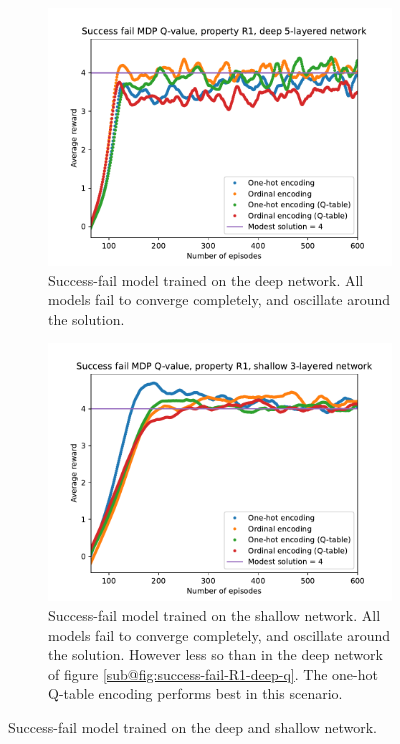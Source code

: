 \begin{figure}
    \centering
    \begin{subfigure}[b]{0.9\textwidth}
        \centering
        \includegraphics[width=\textwidth]{plot/success-fail-R1-q.pdf}
        \caption{Success-fail model trained on the deep network. All models fail to converge completely, and oscillate around the solution.}
        \label{fig:success-fail-R1-deep-q}
    \end{subfigure}
    \vfill
    \begin{subfigure}[b]{0.9\textwidth}
        \centering
        \includegraphics[width=\textwidth]{plot/success-fail-R1-fc128-q.pdf}
        \caption{Success-fail model trained on the shallow network. All models fail to converge completely, and oscillate around the solution. However less so than in the deep network of figure \ref{sub@fig:success-fail-R1-deep-q}. The one-hot Q-table encoding performs best in this scenario.}
        \label{fig:success-fail-R1-shallow-q}
    \end{subfigure}
    \caption{Success-fail model trained on the deep and shallow network.}
    \label{fig:success-fail-R1-q}
\end{figure}

